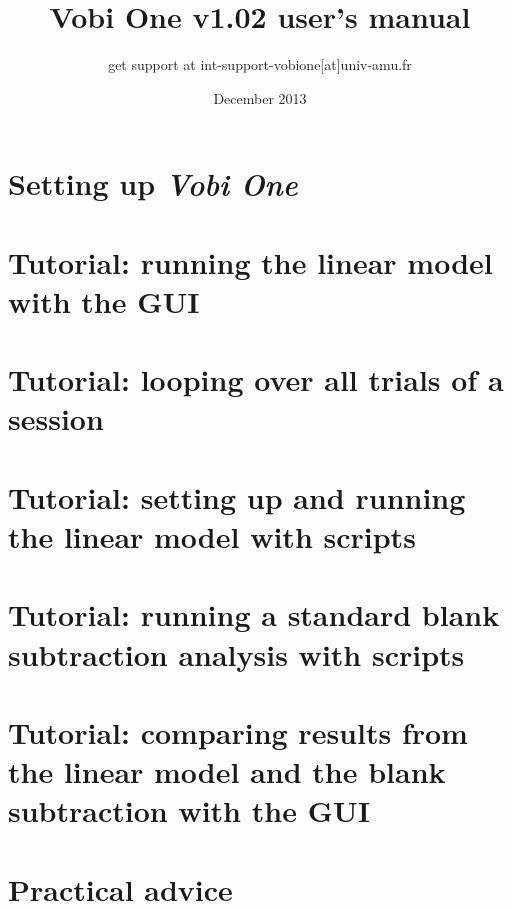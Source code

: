 \documentclass[]{report}   %
\begin{document}
\title{Vobi One v1.02 user's manual}   %
\author{get support at int-support-vobione[at]univ-amu.fr}         %
\date{December 2013}    %
\maketitle



\chapter{Setting up {\em Vobi One}}





\chapter{Tutorial: running the linear model with the GUI}
\label{chapter:tuto1}




\chapter{Tutorial: looping over all trials of a session}
\label{chapter:tuto2}


\chapter{Tutorial: setting up and running the linear model with scripts}
\label{chapter:tuto3}


\chapter{Tutorial: running a standard blank subtraction analysis with scripts}
\label{chapter:tuto4}


\chapter{Tutorial: comparing results from the linear model and the blank subtraction with the GUI}
\label{chapter:tuto5}





\chapter{Practical advice}



\end{document}
